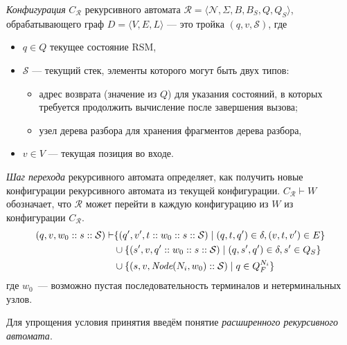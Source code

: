 \begin{definition}
    \emph{Конфигурация} $C_{\mathcal{R}}$ рекурсивного автомата $\mathcal{R}=\langle \mathcal{N},\Sigma,B,B_S,Q,Q_S \rangle$, обрабатывающего граф $D=\langle V,E,L \rangle$ --- это тройка $(q,v,\mathcal{S})$, где
    \begin{itemize}
        \item $q \in Q$ текущее состояние RSM,
        \item $\mathcal{S}$ --- текущий стек, элементы которого могут быть двух типов:
              \begin{itemize}
                  \item адрес возврата (значение из $Q$) для указания состояний, в которых требуется продолжить вычисление после завершения вызова;
                  \item узел дерева разбора для хранения фрагментов дерева разбора,
              \end{itemize}
        \item $v \in V$ --- текущая позиция во входе.
    \end{itemize}
\end{definition}

\begin{definition}\label{def:rsm_transition}
    \emph{Шаг перехода} рекурсивного автомата определяет, как получить новые конфигурации рекурсивного автомата из текущей конфигурации. $C_{\mathcal{R}} \vdash W$ обозначает, что $\mathcal{R}$ может перейти в каждую конфигурацию из $W$ из конфигурации $C_{\mathcal{R}}$.
    \begin{align*}
        (q,v,w_0::s::\mathcal{S})  \vdash & \{ (q',v',t::w_0::s::\mathcal{S}) \mid (q,t,q') \in \delta, (v,t,v') \in E\}     \\
                                          & \cup \{(s', v, q'::w_0::s::\mathcal{S}) \mid (q,s',q') \in \delta, s' \in Q_S \} \\
                                          & \cup \{(s,v,\emph{Node}(N_i, w_0)::\mathcal{S}) \mid q \in Q_F^{N_i}\}
    \end{align*}
    где $w_0$~--- возможно пустая последовательность терминалов и нетерминальных узлов.
\end{definition}

Для упрощения условия принятия введём понятие \textit{расширенного рекурсивного автомата}.

